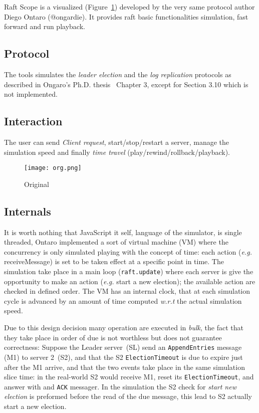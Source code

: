 Raft Scope is a visualized (Figure~\ref{fig:original}) developed by the very same protocol author
Diego Ontaro (@ongardie).
It provides raft basic functionalities simulation, fast forward and run playback.

\subsection{Protocol}
The tools simulates the \emph{leader election} and the \emph{log replication}
protocols as described in Ongaro's Ph.D. thesis~\cite{ongaro2014consensus} Chapter 3,
except for Section 3.10 which is not implemented.

\subsection{Interaction}
The user can send \emph{Client request}, start/stop/restart a server,
manage the simulation speed and finally \emph{time travel} (play/rewind/rollback/playback).

\begin{figure}[h]
    \centering
    \texttt{[image: org.png]}
    \caption{Original}\label{fig:original}
\end{figure}

\subsection{Internals}\label{sec:internals}
It is worth nothing that JavaScript it self, language of the simulator,
is single threaded, Ontaro implemented a sort of virtual machine (VM) where the
concurrency is only simulated playing with the concept of time: each action
(\textit{e.g.} receiveMessage) is set to be taken effect at a specific point
in time.
The simulation take place in a main loop (\texttt{raft.update}) where each
server is give the opportunity to make an action (\emph{e.g.} start a new election);
the available action are checked in defined order.
The VM has an internal clock, that at each simulation cycle is
advanced by an amount of time computed \textit{w.r.t} the actual simulation speed.

Due to this design decision many operation are executed in \emph{bulk}, the fact
that they take place in order of due is not worthless but does not guarantee
correctness: Suppose the Leader server~(SL) send an \texttt{AppendEntries} message (M1)
to server 2~(S2), and that the S2 \texttt{ElectionTimeout} is due to expire just after
the M1 arrive, and that the two events take place in the same simulation slice time:
in the real-world S2 would receive M1, reset its \texttt{ElectionTimeout},
and answer with and \texttt{ACK} messager. In the simulation the S2 check for
\emph{start new election} is preformed before the read of the due message,
this lead to S2 actually start a new election.

